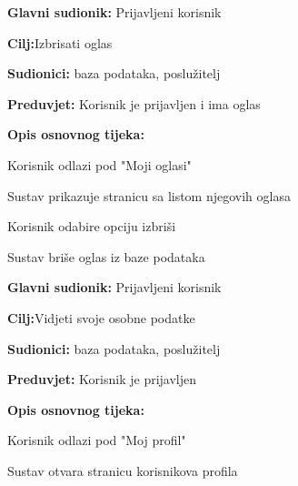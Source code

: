 \noindent {}
\begin{packed_item}
	
	\item \textbf{Glavni sudionik: }Prijavljeni korisnik
	\item  \textbf{Cilj:}Izbrisati oglas
	\item  \textbf{Sudionici:} baza podataka, poslužitelj
	\item  \textbf{Preduvjet:} Korisnik je prijavljen i ima oglas
	\item  \textbf{Opis osnovnog tijeka:}
	
	\item[] \begin{packed_enum}
		
		\item Korisnik odlazi pod "Moji oglasi" 
		\item Sustav prikazuje stranicu sa listom njegovih oglasa
		\item Korisnik odabire opciju izbriši
		\item Sustav briše oglas iz baze podataka
		
	\end{packed_enum}
\end{packed_item}

\noindent {}
\begin{packed_item}
	
	\item \textbf{Glavni sudionik: }Prijavljeni korisnik
	\item  \textbf{Cilj:}Vidjeti svoje osobne podatke
	\item  \textbf{Sudionici:} baza podataka, poslužitelj
	\item  \textbf{Preduvjet:} Korisnik je prijavljen
	\item  \textbf{Opis osnovnog tijeka:}
	
	\item[] \begin{packed_enum}
		
		\item Korisnik odlazi pod "Moj profil"
		\item Sustav otvara stranicu korisnikova profila 
		
	\end{packed_enum}
\end{packed_item}

